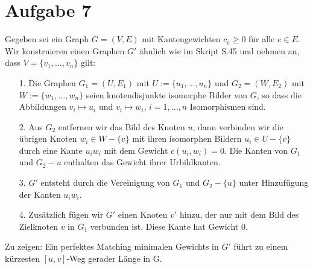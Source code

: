 \documentclass[a4paper,10pt,german]{scrartcl}
\begin{document}
\section*{Aufgabe 7}
Gegeben sei ein Graph $G = (V,E)$ mit Kantengewichten $c_e \ge 0$ für alle $e \in E$. Wir konstruieren einen Graphen $G'$ ähnlich wie im Skript S.45 und nehmen an, dass $V = \{v_1,...,v_n\}$ gilt:
\begin{enumerate}
	\item[1.] Die Graphen $G_1 = (U,E_1)$ mit $U := \{u_1,...,u_n\}$ und $G_2 = (W,E_2)$ mit $W := \{w_1,...,w_n\}$ seien knotendisjunkte isomorphe Bilder von $G$, so dass die Abbildungen $v_i \mapsto u_i $ und $v_i \mapsto w_i$, $i = 1,...,n$ Isomorphismen sind.
	\item[2.] Aus $G_2$ entfernen wir das Bild des Knoten $u$, dann verbinden wir die übrigen Knoten $w_i \in W - \{v\}$ mit ihren isomorphen  Bildern $u_i \in U - \{v\}$ durch eine Kante $u_iw_i$ mit dem Gewicht $c(u_i,w_i)=0$. Die Kanten von $G_1$ und $G_2 - {u}$ enthalten das Gewicht ihrer Urbildkanten.
	\item[3.] $G'$ entsteht durch die Vereinigung von $G_1$ und $G_2 - \{u\}$ unter Hinzufügung der Kanten $u_iw_i$.
	\item[4.] Zusätzlich fügen wir $G'$ einen Knoten $v'$ hinzu, der nur mit dem Bild des Zielknoten $v$ in $G_1$ verbunden ist. Diese Kante hat Gewicht 0.
\end{enumerate}
Zu zeigen: Ein perfektes Matching minimalen Gewichts in $G'$ führt zu einem kürzesten $[u,v]$-Weg gerader Länge in G.
\end{document}
